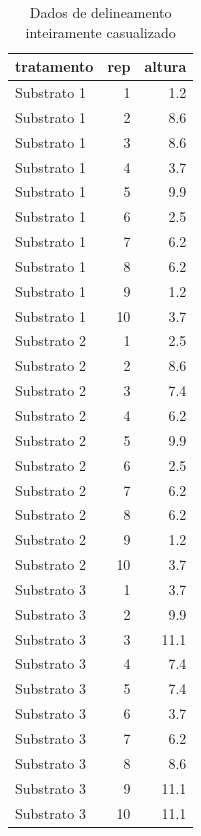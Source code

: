 \documentclass[
]{article}
\begin{document}
\begin{table}

\caption{\label{tab:unnamed-chunk-49}Dados de delineamento inteiramente casualizado}
\centering
\begin{tabular}[t]{l|r|r}
\hline
tratamento & rep & altura\\
\hline
Substrato 1 & 1 & 1.2\\
\hline
Substrato 1 & 2 & 8.6\\
\hline
Substrato 1 & 3 & 8.6\\
\hline
Substrato 1 & 4 & 3.7\\
\hline
Substrato 1 & 5 & 9.9\\
\hline
Substrato 1 & 6 & 2.5\\
\hline
Substrato 1 & 7 & 6.2\\
\hline
Substrato 1 & 8 & 6.2\\
\hline
Substrato 1 & 9 & 1.2\\
\hline
Substrato 1 & 10 & 3.7\\
\hline
Substrato 2 & 1 & 2.5\\
\hline
Substrato 2 & 2 & 8.6\\
\hline
Substrato 2 & 3 & 7.4\\
\hline
Substrato 2 & 4 & 6.2\\
\hline
Substrato 2 & 5 & 9.9\\
\hline
Substrato 2 & 6 & 2.5\\
\hline
Substrato 2 & 7 & 6.2\\
\hline
Substrato 2 & 8 & 6.2\\
\hline
Substrato 2 & 9 & 1.2\\
\hline
Substrato 2 & 10 & 3.7\\
\hline
Substrato 3 & 1 & 3.7\\
\hline
Substrato 3 & 2 & 9.9\\
\hline
Substrato 3 & 3 & 11.1\\
\hline
Substrato 3 & 4 & 7.4\\
\hline
Substrato 3 & 5 & 7.4\\
\hline
Substrato 3 & 6 & 3.7\\
\hline
Substrato 3 & 7 & 6.2\\
\hline
Substrato 3 & 8 & 8.6\\
\hline
Substrato 3 & 9 & 11.1\\
\hline
Substrato 3 & 10 & 11.1\\
\hline
\end{tabular}
\end{table}
\end{document}
